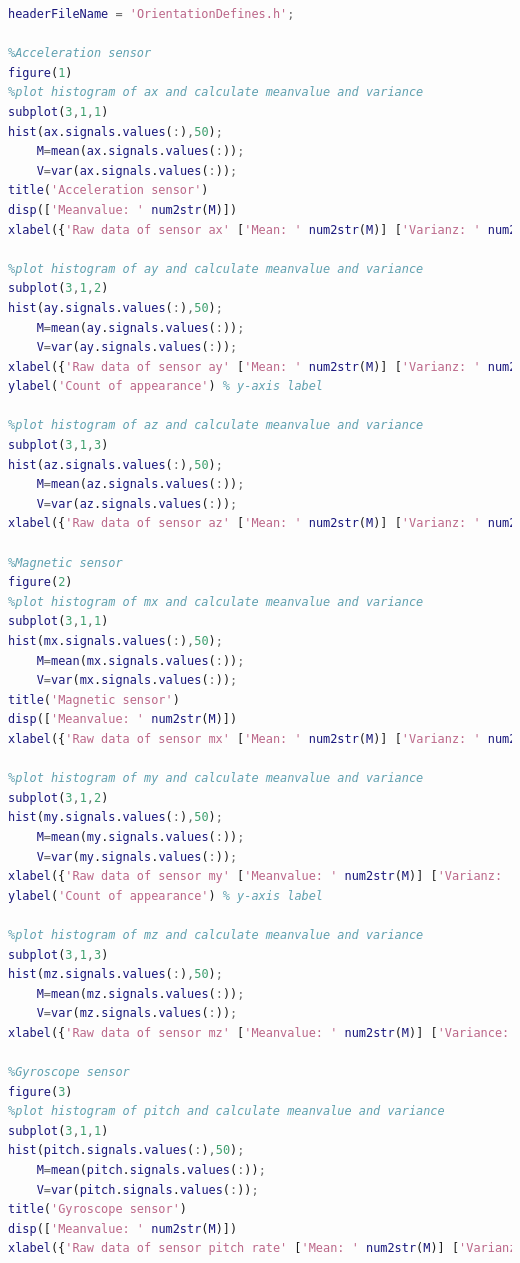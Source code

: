 
\begin{lstlisting}[caption={[MATLAB script to calibrate the magnetometer]MATLAB script to calibrate the magnetometer and automatically generate a header file with calibration data.}, label=code:SensFusContr:calibMagMatlab,language=MATLAB]
headerFileName = 'OrientationDefines.h';

%Acceleration sensor
figure(1)
%plot histogram of ax and calculate meanvalue and variance
subplot(3,1,1)
hist(ax.signals.values(:),50);
    M=mean(ax.signals.values(:));
    V=var(ax.signals.values(:));
title('Acceleration sensor')
disp(['Meanvalue: ' num2str(M)])
xlabel({'Raw data of sensor ax' ['Mean: ' num2str(M)] ['Varianz: ' num2str(V)]}) % x-axis label

%plot histogram of ay and calculate meanvalue and variance
subplot(3,1,2)
hist(ay.signals.values(:),50);
    M=mean(ay.signals.values(:));
    V=var(ay.signals.values(:));
xlabel({'Raw data of sensor ay' ['Mean: ' num2str(M)] ['Varianz: ' num2str(V)]}) % x-axis label
ylabel('Count of appearance') % y-axis label

%plot histogram of az and calculate meanvalue and variance
subplot(3,1,3)
hist(az.signals.values(:),50);
    M=mean(az.signals.values(:));
    V=var(az.signals.values(:));
xlabel({'Raw data of sensor az' ['Mean: ' num2str(M)] ['Varianz: ' num2str(V)]}) % x-axis label

%Magnetic sensor
figure(2)
%plot histogram of mx and calculate meanvalue and variance
subplot(3,1,1)
hist(mx.signals.values(:),50);
    M=mean(mx.signals.values(:));
    V=var(mx.signals.values(:));
title('Magnetic sensor')
disp(['Meanvalue: ' num2str(M)])
xlabel({'Raw data of sensor mx' ['Mean: ' num2str(M)] ['Varianz: ' num2str(V)]}) % x-axis label

%plot histogram of my and calculate meanvalue and variance
subplot(3,1,2)
hist(my.signals.values(:),50);
    M=mean(my.signals.values(:));
    V=var(my.signals.values(:));
xlabel({'Raw data of sensor my' ['Meanvalue: ' num2str(M)] ['Varianz: ' num2str(V)]}) % x-axis label
ylabel('Count of appearance') % y-axis label

%plot histogram of mz and calculate meanvalue and variance
subplot(3,1,3)
hist(mz.signals.values(:),50);
    M=mean(mz.signals.values(:));
    V=var(mz.signals.values(:));
xlabel({'Raw data of sensor mz' ['Meanvalue: ' num2str(M)] ['Variance: ' num2str(V)]}) % x-axis label

%Gyroscope sensor
figure(3)
%plot histogram of pitch and calculate meanvalue and variance
subplot(3,1,1)
hist(pitch.signals.values(:),50);
    M=mean(pitch.signals.values(:));
    V=var(pitch.signals.values(:));
title('Gyroscope sensor')
disp(['Meanvalue: ' num2str(M)])
xlabel({'Raw data of sensor pitch rate' ['Mean: ' num2str(M)] ['Varianz: ' num2str(V)]}) % x-axis label


\end{lstlisting}
